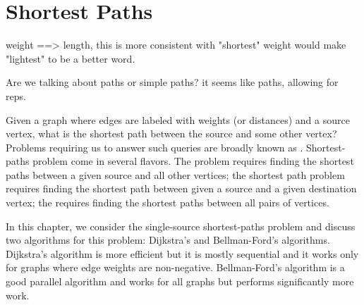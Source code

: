 \chapter{Shortest Paths}
\label{ch:shortest-paths}

\newcommand{\visited}{X}
\newcommand{\unvisited}{T}
\newcommand{\ev}{\sml{eVal}}
\newcommand{\dist}{\delta}
\newcommand{\sssp}{\probName{SSSP}}
\newcommand{\ssspp}{\probName{SSSP$^+$}}
\newcommand{\ssspd}{\probName{SSSP$_{\dist}$}}
\newcommand{\sssppd}{\probName{SSSP$^+_{\dist}$}}

\begin{todo}
 weight ==> length, this is more consistent with "shortest"
 weight would make "lightest" to be a better word.
\end{todo}

\begin{todo}
Are we talking about paths or simple paths? it seems like paths,
allowing for reps.
\end{todo}

Given a graph where edges are labeled with weights (or distances) and
a source vertex, what is the shortest path between the source and some
other vertex?  Problems requiring us to answer such queries are
broadly known as . 
%
Shortest-paths problem come in several flavors. 
%
The  problem requires finding the
shortest paths between a given source and all other vertices;
%
the  shortest path problem requires finding the
shortest path between given a source and a given destination vertex;
%
the  requires finding the
shortest paths between all pairs of vertices.

In this chapter, we consider the single-source shortest-paths problem
and discuss two algorithms for this problem: Dijkstra's and
Bellman-Ford's algorithms.  Dijkstra's algorithm is more efficient but
it is mostly sequential and it works only for graphs where edge
weights are non-negative.  
%
Bellman-Ford's algorithm is a good parallel
algorithm and works for all graphs but performs significantly more work.




